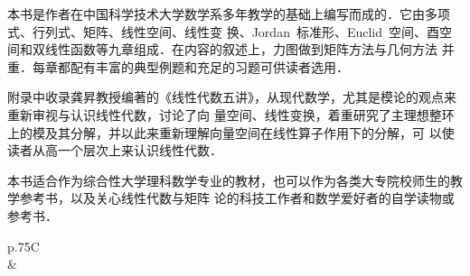 \begin{changemargin}{8mm}{8mm}
\newbox\CIPInf
\sbox{}
\newbox\COPYRIGHT
\sbox{}
\newbox\TeXlion
\sbox{}
\newbox\GNULogo
\sbox{}

\fzwkai\TeXGyreBonum

本书是作者在中国科学技术大学数学系多年教学的基础上编写而成的．它由多项式、行列式、矩阵、线性空间、线性变
换、Jordan~标准形、Euclid~空间、酉空间和双线性函数等九章组成．在内容的叙述上，力图做到矩阵方法与几何方法
并重．每章都配有丰富的典型例题和充足的习题可供读者选用．

附录中收录龚昇教授编著的《线性代数五讲》，从现代数学，尤其是模论的观点来重新审视与认识线性代数，讨论了向
量空间、线性变换，着重研究了主理想整环上的模及其分解，并以此来重新理解向量空间在线性算子作用下的分解，可
以使读者从高一个层次上来认识线性代数．

本书适合作为综合性大学理科数学专业的教材，也可以作为各类大专院校师生的教学参考书，以及关心线性代数与矩阵
论的科技工作者和数学爱好者的自学读物或参考书．

\centering


\noindent\begin{tabularx}{\linewidth}{p{.75\linewidth}C}
  \\
\specialrule{1pt}{1pt}{5pt}
\usebox\CIPInf                 &   \usebox\GNULogo     \\
\specialrule{1pt}{5pt}{0pt}
\end{tabularx}


\end{changemargin}
